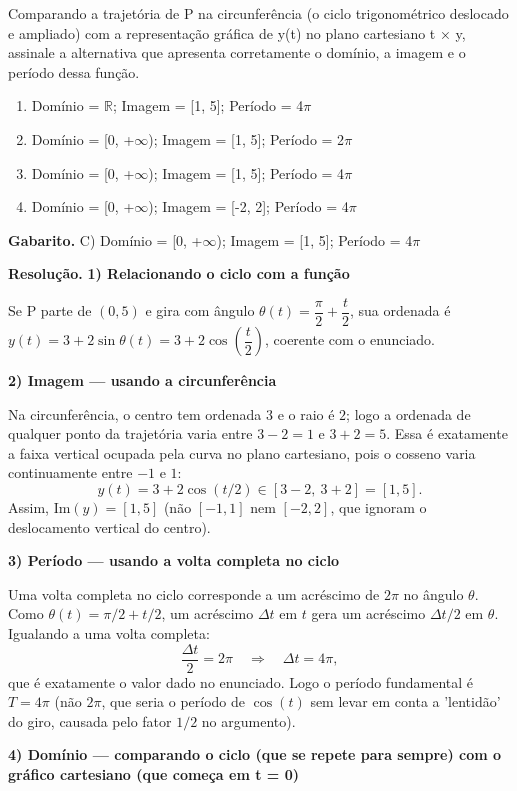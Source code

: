 \documentclass[11pt,a4paper]{article}
\begin{document}
Comparando a trajetória de P na circunferência (o ciclo trigonométrico deslocado e ampliado) com a representação gráfica de y(t) no plano cartesiano t × y, assinale a alternativa que apresenta corretamente o domínio, a imagem e o período dessa função.
\begin{enumerate}[label=(\alph*)]
\item Domínio = $\mathbb{R}$; Imagem = [1, 5]; Período = 4$\pi$
\item Domínio = [0, +$\infty$); Imagem = [1, 5]; Período = 2$\pi$
\item Domínio = [0, +$\infty$); Imagem = [1, 5]; Período = 4$\pi$
\item Domínio = [0, +$\infty$); Imagem = [-2, 2]; Período = 4$\pi$
\end{enumerate}

\textbf{Gabarito.} C) Domínio = [0, +$\infty$); Imagem = [1, 5]; Período = 4$\pi$

\textbf{Resolução.} \textbf{1) Relacionando o ciclo com a função}

Se P parte de $(0,5)$ e gira com ângulo $\theta(t) = \dfrac{\pi}{2} + \dfrac{t}{2}$, sua ordenada é $y(t) = 3 + 2\sin\theta(t) = 3 + 2\cos\left(\dfrac{t}{2}\right)$, coerente com o enunciado.

\textbf{2) Imagem — usando a circunferência}

Na circunferência, o centro tem ordenada $3$ e o raio é $2$; logo a ordenada de qualquer ponto da trajetória varia entre $3-2=1$ e $3+2=5$. Essa é exatamente a faixa vertical ocupada pela curva no plano cartesiano, pois o cosseno varia continuamente entre $-1$ e $1$:
$$y(t) = 3 + 2\cos(t/2) \in [3-2,\ 3+2] = [1,5].$$
Assim, $\text{Im}(y) = [1,5]$ (não $[-1,1]$ nem $[-2,2]$, que ignoram o deslocamento vertical do centro).

\textbf{3) Período — usando a volta completa no ciclo}

Uma volta completa no ciclo corresponde a um acréscimo de $2\pi$ no ângulo $\theta$. Como $\theta(t) = \pi/2 + t/2$, um acréscimo $\Delta t$ em $t$ gera um acréscimo $\Delta t/2$ em $\theta$. Igualando a uma volta completa:
$$\frac{\Delta t}{2} = 2\pi \quad\Rightarrow\quad \Delta t = 4\pi,$$
que é exatamente o valor dado no enunciado. Logo o período fundamental é $T = 4\pi$ (não $2\pi$, que seria o período de $\cos(t)$ sem levar em conta a 'lentidão' do giro, causada pelo fator $1/2$ no argumento).

\textbf{4) Domínio — comparando o ciclo (que se repete para sempre) com o gráfico cartesiano (que começa em t = 0)}
\end{document}
